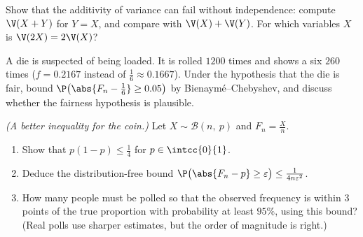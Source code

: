 \begin{exercise}[$\star\star$]\label{exo:tle:sums:6}
Show that the additivity of variance can fail without independence:
compute $\V(X + Y)$ for $Y = X$, and compare with $\V(X) + \V(Y)$. For
which variables $X$ is $\V(2X) = 2\V(X)$?
\end{exercise}

\begin{exercise}[$\star\star$]\label{exo:tle:sums:7}
A die is suspected of being loaded. It is rolled $1200$ times and shows a
six $260$ times ($f = 0.2167$ instead of $\frac16 \approx 0.1667$). Under
the hypothesis that the die is fair, bound
$\P\bigl(\abs{F_n - \frac16} \geq 0.05\bigr)$ by Bienaymé--Chebyshev, and
discuss whether the fairness hypothesis is plausible.
\end{exercise}

\begin{exercise}[$\star\star\star$]\label{exo:tle:sums:8}
\emph{(A better inequality for the coin.)} Let
$X \sim \mathcal B(n,\ p)$ and $F_n = \frac Xn$.
\begin{enumerate}
  \item Show that $p(1-p) \leq \frac14$ for $p \in \intcc{0}{1}$.
  \item Deduce the distribution-free bound
        $\P\bigl(\abs{F_n - p} \geq \varepsilon\bigr) \leq
        \frac{1}{4n\varepsilon^2}$.
  \item How many people must be polled so that the observed frequency is
        within $3$ points of the true proportion with probability at least
        $95\%$, using this bound? (Real polls use sharper estimates, but
        the order of magnitude is right.)
\end{enumerate}
\end{exercise}
